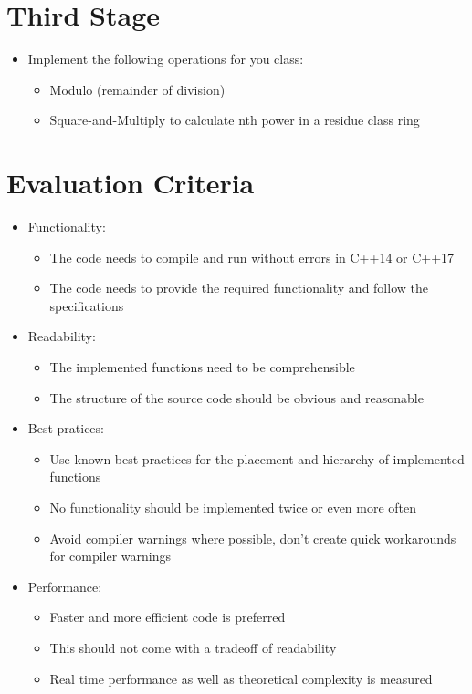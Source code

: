 \documentclass[12pt, a4paper]{article}
\begin{document}
\section*{Third Stage}
\begin{itemize}
    \item Implement the following operations for you class:
    \begin{itemize}
        \item Modulo (remainder of division)
        \item Square-and-Multiply to calculate nth power in a residue class ring
    \end{itemize}
\end{itemize}
\section*{Evaluation Criteria}
\begin{itemize}
    \item Functionality:
    \begin{itemize}
        \item The code needs to compile and run without errors in C++14 or C++17
        \item The code needs to provide the required functionality and follow the specifications
    \end{itemize}
    \item Readability:
    \begin{itemize}
        \item The implemented functions need to be comprehensible
        \item The structure of the source code should be obvious and reasonable
    \end{itemize}
    \item Best pratices:
    \begin{itemize}
        \item Use known best practices for the placement and hierarchy of implemented functions
        \item No functionality should be implemented twice or even more often
        \item Avoid compiler warnings where possible, don't create quick workarounds for compiler warnings
    \end{itemize}
    \item Performance:
    \begin{itemize}
        \item Faster and more efficient code is preferred
        \item This should not come with a tradeoff of readability
        \item Real time performance as well as theoretical complexity is measured
    \end{itemize}
\end{itemize}
\end{document}
